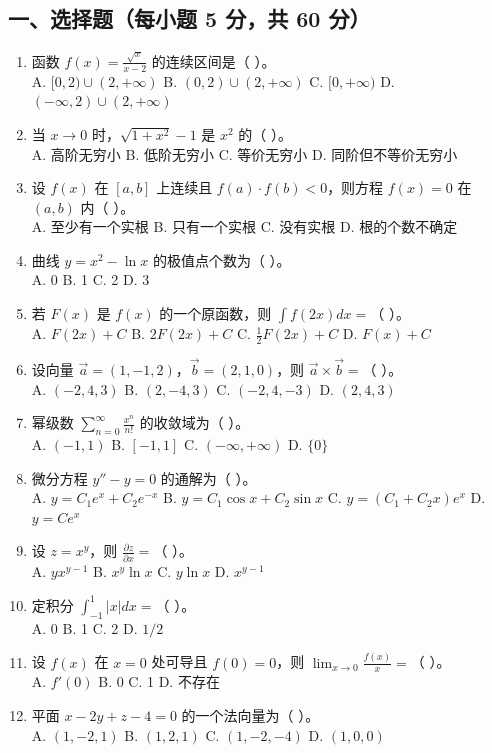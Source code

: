 \documentclass[11pt,a4paper]{article}
\begin{document}
\subsection*{一、选择题（每小题 5 分，共 60 分）}
\begin{enumerate}
    \item 函数 $f(x) = \frac{\sqrt{x}}{x-2}$ 的连续区间是（ ）。 \\
    A. $[0, 2) \cup (2, +\infty)$ \quad B. $(0, 2) \cup (2, +\infty)$ \quad C. $[0, +\infty)$ \quad D. $(-\infty, 2) \cup (2, +\infty)$
    \item 当 $x \to 0$ 时，$\sqrt{1+x^2} - 1$ 是 $x^2$ 的（ ）。 \\
    A. 高阶无穷小 \quad B. 低阶无穷小 \quad C. 等价无穷小 \quad D. 同阶但不等价无穷小
    \item 设 $f(x)$ 在 $[a, b]$ 上连续且 $f(a) \cdot f(b) < 0$，则方程 $f(x)=0$ 在 $(a, b)$ 内（ ）。 \\
    A. 至少有一个实根 \quad B. 只有一个实根 \quad C. 没有实根 \quad D. 根的个数不确定
    \item 曲线 $y = x^2 - \ln x$ 的极值点个数为（ ）。 \\
    A. 0 \quad B. 1 \quad C. 2 \quad D. 3
    \item 若 $F(x)$ 是 $f(x)$ 的一个原函数，则 $\int f(2x) dx = $（ ）。 \\
    A. $F(2x) + C$ \quad B. $2F(2x) + C$ \quad C. $\frac{1}{2}F(2x) + C$ \quad D. $F(x) + C$
    \item 设向量 $\vec{a}=(1, -1, 2)$，$\vec{b}=(2, 1, 0)$，则 $\vec{a} \times \vec{b} = $（ ）。 \\
    A. $(-2, 4, 3)$ \quad B. $(2, -4, 3)$ \quad C. $(-2, 4, -3)$ \quad D. $(2, 4, 3)$
    \item 幂级数 $\sum_{n=0}^{\infty} \frac{x^n}{n!}$ 的收敛域为（ ）。 \\
    A. $(-1, 1)$ \quad B. $[-1, 1]$ \quad C. $(-\infty, +\infty)$ \quad D. $\{0\}$
    \item 微分方程 $y'' - y = 0$ 的通解为（ ）。 \\
    A. $y = C_1 e^x + C_2 e^{-x}$ \quad B. $y = C_1 \cos x + C_2 \sin x$ \quad C. $y = (C_1+C_2x)e^x$ \quad D. $y = C e^x$
    \item 设 $z = x^y$，则 $\frac{\partial z}{\partial x} = $（ ）。 \\
    A. $y x^{y-1}$ \quad B. $x^y \ln x$ \quad C. $y \ln x$ \quad D. $x^{y-1}$
    \item 定积分 $\int_{-1}^1 |x| dx = $（ ）。 \\
    A. 0 \quad B. 1 \quad C. 2 \quad D. $1/2$
    \item 设 $f(x)$ 在 $x=0$ 处可导且 $f(0)=0$，则 $\lim_{x \to 0} \frac{f(x)}{x} = $（ ）。 \\
    A. $f'(0)$ \quad B. 0 \quad C. 1 \quad D. 不存在
    \item 平面 $x - 2y + z - 4 = 0$ 的一个法向量为（ ）。 \\
    A. $(1, -2, 1)$ \quad B. $(1, 2, 1)$ \quad C. $(1, -2, -4)$ \quad D. $(1, 0, 0)$
\end{enumerate}
\end{document}
